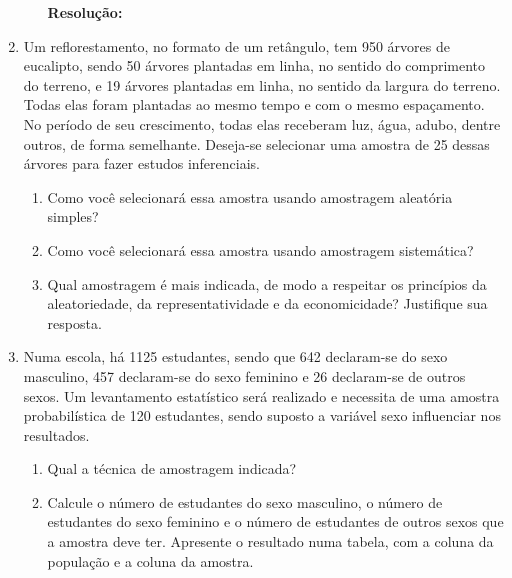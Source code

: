 \begin{enumerate}[label=\emph{\arabic*})]
\begin{enumerate}[label=\emph{\alph*})]
		            \textbf{Resolução:}~

	      \end{enumerate}

	\item Um reflorestamento, no formato de um retângulo, tem 950 árvores de eucalipto, sendo
	      50 árvores plantadas em linha, no sentido do comprimento do terreno, e 19 árvores
	      plantadas em linha, no sentido da largura do terreno. Todas elas foram plantadas ao mesmo
	      tempo e com o mesmo espaçamento. No período de seu crescimento, todas elas
	      receberam luz, água, adubo, dentre outros, de forma semelhante. Deseja-se selecionar
	      uma amostra de 25 dessas árvores para fazer estudos inferenciais.

	      \begin{enumerate}[label=\emph{\alph*})]

		      \item Como você selecionará essa amostra usando amostragem aleatória simples?

		      \item Como você selecionará essa amostra usando amostragem sistemática?

		      \item Qual amostragem é mais indicada, de modo a respeitar os princípios da aleatoriedade,
		            da representatividade e da economicidade? Justifique sua resposta.

	      \end{enumerate}

	\item Numa escola, há 1125 estudantes, sendo que 642 declaram-se do sexo masculino, 457
	      declaram-se do sexo feminino e 26 declaram-se de outros sexos. Um levantamento estatístico
	      será realizado e necessita de uma amostra probabilística de 120 estudantes, sendo suposto a
	      variável sexo influenciar nos resultados.

	      \begin{enumerate}[label=\emph{\alph*})]

		      \item Qual a técnica de amostragem indicada?


		      \item Calcule o número de estudantes do sexo masculino, o número de estudantes do sexo
		            feminino e o número de estudantes de outros sexos que a amostra deve ter. Apresente o
		            resultado numa tabela, com a coluna da população e a coluna da amostra.


\end{enumerate}
\end{enumerate}

